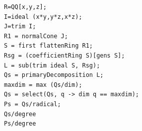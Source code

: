 \documentclass[11pt,a4paper,leqno,noamsfonts]{amsart}
\numberwithin{equation}{section}
\begin{document}
\begin{verbatim}
R=QQ[x,y,z];
I=ideal (x*y,y*z,x*z);
J=trim I;
R1 = normalCone J;
S = first flattenRing R1;
Rsg = (coefficientRing S)[gens S];
L = sub(trim ideal S, Rsg);
Qs = primaryDecomposition L;
maxdim = max (Qs/dim);
Qs = select(Qs, q -> dim q == maxdim);
Ps = Qs/radical;
Qs/degree
Ps/degree
\end{verbatim}






















 

\end{document}
